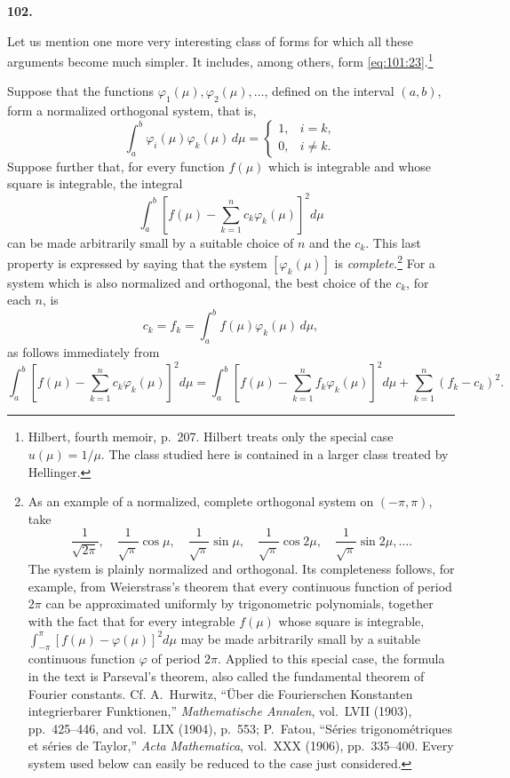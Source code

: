 \documentclass[
  paper=b5,
  fontsize=13pt,
  twoside=true,
  open=any,
  bookmarkpackage=false,
  chapterprefix=true,
  headings=normal
]{scrbook}
\theoremstyle{definition}
\newcommand{\numberedparagraph}[1]{%
  \par\medskip\phantomsection\label{sec:#1}%
  \noindent\textbf{#1.}\enspace
}
\begin{document}
\numberedparagraph{102}
Let us mention one more very interesting class of forms for which all these
arguments become much simpler.  It includes, among others, form
\eqref{eq:101:23}.\footnote{Hilbert, fourth memoir, p.~207.  Hilbert treats only
the special case \(u(\mu)=1/\mu\).  The class studied here is contained in a
larger class treated by Hellinger.}

Suppose that the functions
\(\varphi_1(\mu),\varphi_2(\mu),\ldots\), defined on the interval \((a,b)\),
form a normalized orthogonal system, that is,
\[
  \int_a^b\varphi_i(\mu)\varphi_k(\mu)\,d\mu
  =\begin{cases}1,&i=k,\\0,&i\ne k.\end{cases}
\]
Suppose further that, for every function \(f(\mu)\) which is integrable and
whose square is integrable, the integral
\[
  \int_a^b\left[f(\mu)-\sum_{k=1}^{n}c_k\varphi_k(\mu)\right]^2d\mu
\]
can be made arbitrarily small
by a suitable choice of \(n\) and the \(c_k\).
This last property is expressed by saying that the system
\([\varphi_k(\mu)]\) is \emph{complete}.\footnote{As an example of a
normalized, complete orthogonal system on \((-\pi,\pi)\), take
\[
  \frac1{\sqrt{2\pi}},\quad
  \frac1{\sqrt\pi}\cos\mu,\quad
  \frac1{\sqrt\pi}\sin\mu,\quad
  \frac1{\sqrt\pi}\cos2\mu,\quad
  \frac1{\sqrt\pi}\sin2\mu,\ldots.
\]
The system is plainly normalized and orthogonal.  Its completeness follows,
for example, from Weierstrass's theorem that every continuous function of
period \(2\pi\) can be approximated uniformly by trigonometric polynomials,
together with the fact that for every integrable \(f(\mu)\) whose square is
integrable, \(\int_{-\pi}^{\pi}[f(\mu)-\varphi(\mu)]^2d\mu\) may be made
arbitrarily small by a suitable continuous function \(\varphi\) of period
\(2\pi\).  Applied to this special case, the formula in the text is Parseval's
theorem, also called the fundamental theorem of Fourier constants.  Cf.
A.~Hurwitz, ``Über die Fourierschen Konstanten integrierbarer Funktionen,''
\emph{Mathematische Annalen}, vol.~LVII (1903), pp.~425--446, and vol.~LIX
(1904), p.~553; P.~Fatou, ``Séries trigonométriques et séries de Taylor,''
\emph{Acta Mathematica}, vol.~XXX (1906), pp.~335--400.  Every system used
below can easily be reduced to the case just considered.}
For a system which is also normalized and orthogonal, the best choice of the
\(c_k\), for each \(n\), is
\[
  c_k=f_k=\int_a^b f(\mu)\varphi_k(\mu)\,d\mu,
\]
as follows immediately from
\[
  \int_a^b\left[f(\mu)-\sum_{k=1}^{n}c_k\varphi_k(\mu)\right]^2d\mu
  =\int_a^b\left[f(\mu)-\sum_{k=1}^{n}f_k\varphi_k(\mu)\right]^2d\mu
   +\sum_{k=1}^{n}(f_k-c_k)^2.
\]
\end{document}
